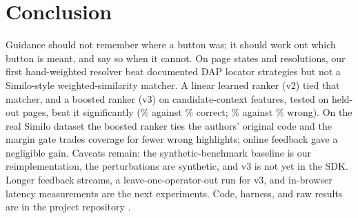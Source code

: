 \documentclass[conference]{IEEEtran}
\begin{document}
\section{Conclusion}\label{sec:concl}
Guidance should not remember where a button was; it should work out which button is meant, and say so when it cannot. On \nPages{} page states and \nTrials{} resolutions, our first hand-weighted resolver beat documented DAP locator strategies but not a Similo-style weighted-similarity matcher. A linear learned ranker (v2) tied that matcher, and a boosted ranker (v3) on candidate-context features, tested on held-out pages, beat it significantly (\gbC\% against \simC\% correct; \gbW\% against \simW\% wrong). On the real Similo dataset the boosted ranker ties the authors' original code and the margin gate trades coverage for fewer wrong highlights; online feedback gave a negligible gain. Caveats remain: the synthetic-benchmark baseline is our reimplementation, the perturbations are synthetic, and v3 is not yet in the SDK. Longer feedback streams, a leave-one-operator-out run for v3, and in-browser latency measurements are the next experiments. Code, harness, and raw results are in the project repository \cite{project_repo}.



\end{document}
